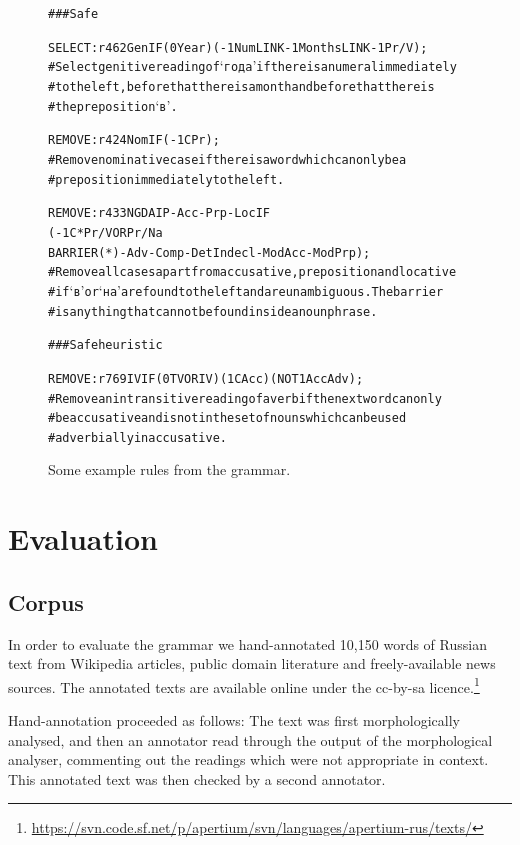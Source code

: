 \documentclass[11pt]{article}
\newcommand{\rus}[1]{\foreignlanguage{russian}{#1}}
\newcommand{\rr}[1]{\marginpar{\scriptsize R: #1}} %
\begin{document}
\begin{figure}

\begin{alltt}
{\small
### Safe

SELECT:r462 Gen IF (0 Year) (-1 Num LINK -1 Months LINK -1 Pr/V);
  # Select genitive reading of `\rus{года}' if there is a numeral immediately
  # to the left, before that there is a month and before that there is 
  # the preposition `\rus{в}'.

REMOVE:r424 Nom IF (-1C Pr) ;
  # Remove nominative case if there is a word which can only be a 
  # preposition immediately to the left.

REMOVE:r433 NGDAIP - Acc - Prp - Loc IF 
                (-1C* Pr/V OR Pr/Na
                  BARRIER (*) - Adv - Comp - DetIndecl - ModAcc - ModPrp);
  # Remove all cases apart from accusative, preposition and locative
  # if `\rus{в}' or `\rus{на}' are found to the left and are unambiguous. The barrier
  # is anything that cannot be found inside a noun phrase.

### Safe heuristic

REMOVE:r769 IV IF (0 TV OR IV) (1C Acc) (NOT 1 AccAdv);
  # Remove an intransitive reading of a verb if the next word can only
  # be accusative and is not in the set of nouns which can be used 
  # adverbially in accusative.
}
\end{alltt}
  \caption{Some example rules from the grammar.}
  \label{fig:rules}
\end{figure}

\section{Evaluation}
\label{sec:eval}

\subsection{Corpus}
In order to evaluate the grammar we hand-annotated 10,150 words of Russian text
from Wikipedia articles, public domain literature and freely-available news sources. The
annotated texts are available online under the {\sc cc-by-sa} licence.\footnote{\url{https://svn.code.sf.net/p/apertium/svn/languages/apertium-rus/texts/}}

Hand-annotation proceeded as follows: The text was first morphologically analysed, 
and then an annotator read through the output of the morphological analyser, commenting
out the readings which were not appropriate in context. This annotated text was then checked
by a second annotator.
\end{document}
